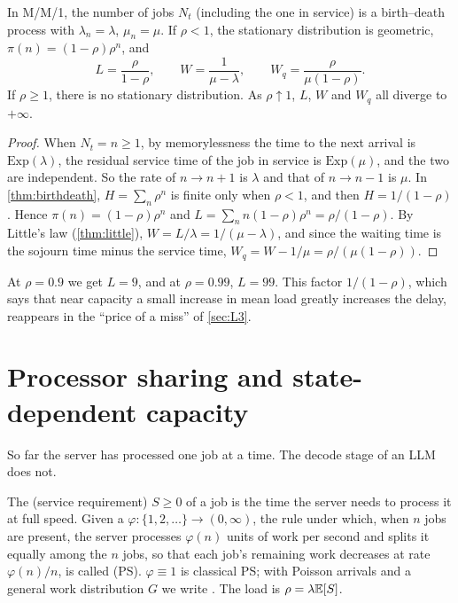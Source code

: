 \begin{proposition}\label{prop:mm1}
In M/M/1, the number of jobs $N_t$ (including the one in service) is a birth--death
process with $\lambda_n=\lambda$, $\mu_n=\mu$. If $\rho<1$, the stationary
distribution is geometric, $\pi(n)=(1-\rho)\rho^n$, and
\[
  L=\frac{\rho}{1-\rho},\qquad W=\frac{1}{\mu-\lambda},\qquad W_q=\frac{\rho}{\mu(1-\rho)} .
\]
If $\rho\ge1$, there is no stationary distribution. As $\rho\uparrow1$, $L$, $W$ and
$W_q$ all diverge to $+\infty$.
\end{proposition}
\begin{proof}
When $N_t=n\ge1$, by memorylessness the time to the next arrival is $\mathrm{Exp}(\lambda)$,
the residual service time of the job in service is $\mathrm{Exp}(\mu)$, and the two are
independent. So the rate of $n\to n+1$ is $\lambda$ and that of $n\to n-1$ is $\mu$.
In \cref{thm:birthdeath}, $H=\sum_n\rho^n$ is finite only when $\rho<1$, and then
$H=1/(1-\rho)$. Hence $\pi(n)=(1-\rho)\rho^n$ and
$L=\sum_n n(1-\rho)\rho^n=\rho/(1-\rho)$. By Little's law (\cref{thm:little}),
$W=L/\lambda=1/(\mu-\lambda)$, and since the waiting time is the sojourn time minus the
service time, $W_q=W-1/\mu=\rho/(\mu(1-\rho))$.
\end{proof}

At $\rho=0.9$ we get $L=9$, and at $\rho=0.99$, $L=99$. This factor $1/(1-\rho)$, which
says that near capacity a small increase in mean load greatly increases the delay,
reappears in the ``price of a miss'' of \cref{sec:L3}.

\section{Processor sharing and state-dependent capacity}

So far the server has processed one job at a time. The decode stage of an LLM does not.

\begin{definition}\label{def:ps}
The  (service requirement) $S\ge0$ of a job is the time the server needs to
process it at full speed.
Given a  $\varphi:\{1,2,\dots\}\to(0,\infty)$, the rule under
which, when $n$ jobs are present, the server processes $\varphi(n)$ units of work per
second and splits it equally among the $n$ jobs, so that each job's remaining work
decreases at rate $\varphi(n)/n$, is called  (PS).
$\varphi\equiv1$ is classical PS; with Poisson arrivals and a general work distribution
$G$ we write . The load is $\rho=\lambda\mathbb{E}[S]$.
\end{definition}

